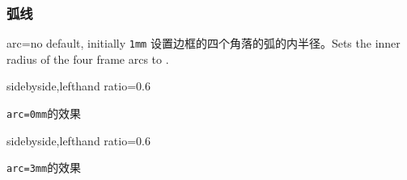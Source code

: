 \setcounter{section}{4}
\setcounter{subsection}{7}
\setcounter{subsubsection}{2}
\subsubsection{弧线}
\begin{docTcbKey}{arc}{=}{no default, initially \texttt{1mm}}
设置边框的四个角落的弧的内半径。\hfill Sets the inner radius of the four frame arcs to .


\begin{dispExample*}{sidebyside,lefthand ratio=0.6}
\begin{tcolorbox}[arc=0mm]
\verb|arc=0mm|的效果
\end{tcolorbox}
\end{dispExample*}

\begin{dispExample*}{sidebyside,lefthand ratio=0.6}
\begin{tcolorbox}[arc=3mm]
\verb|arc=3mm|的效果
\end{tcolorbox}
\end{dispExample*}
\end{docTcbKey}



 

 



